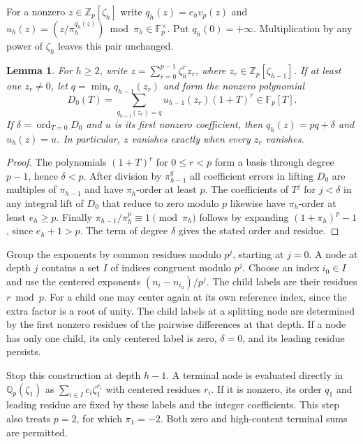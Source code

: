 \documentclass[11pt]{article}
\newtheorem{lemma}[theorem]{Lemma}
\newcommand{\Z}{\mathbb Z}
\newcommand{\Q}{\mathbb Q}
\newcommand{\F}{\mathbb F}
\newcommand{\ord}{\operatorname{ord}}
\begin{document}
For a nonzero $z\in\Z_p[\zeta_h]$ write $q_h(z)=e_hv_p(z)$ and $u_h(z)=(z/\pi_h^{q_h(z)})\bmod\pi_h\in\F_p^\times$. Put $q_h(0)=+\infty$. Multiplication by any power of $\zeta_h$ leaves this pair unchanged.

\begin{lemma}\label{rec}
For $h\ge2$, write $z=\sum_{r=0}^{p-1}\zeta_h^r z_r$, where $z_r\in\Z_p[\zeta_{h-1}]$. If at least one $z_r\ne0$, let $q=\min_r q_{h-1}(z_r)$ and form the nonzero polynomial
\[
D_0(T)=\sum_{q_{h-1}(z_r)=q}u_{h-1}(z_r)(1+T)^r \in\F_p[T].
\]
If $\delta=\ord_{T=0}D_0$ and $u$ is its first nonzero coefficient, then $q_h(z)=pq+\delta$ and $u_h(z)=u$. In particular, $z$ vanishes exactly when every $z_r$ vanishes.
\end{lemma}
\begin{proof}
The polynomials $(1+T)^r$ for $0\le r<p$ form a basis through degree $p-1$, hence $\delta<p$. After division by $\pi_{h-1}^{q}$ all coefficient errors in lifting $D_0$ are multiples of $\pi_{h-1}$ and have $\pi_h$-order at least $p$. The coefficients of $T^j$ for $j<\delta$ in any integral lift of $D_0$ that reduce to zero modulo $p$ likewise have $\pi_h$-order at least $e_h\ge p$. Finally $\pi_{h-1}/\pi_h^p\equiv1\pmod{\pi_h}$ follows by expanding $(1+\pi_h)^p-1$, since $e_h+1>p$. The term of degree $\delta$ gives the stated order and residue.
\end{proof}

Group the exponents by common residues modulo $p^j$, starting at $j=0$. A node at depth $j$ contains a set $I$ of indices congruent modulo $p^j$. Choose an index $i_0\in I$ and use the centered exponents $(n_i-n_{i_0})/p^j$. The child labels are their residues $r\bmod p$. For a child one may center again at its own reference index, since the extra factor is a root of unity. The child labels at a splitting node are determined by the first nonzero residues of the pairwise differences at that depth. If a node has only one child, its only centered label is zero, $\delta=0$, and its leading residue persists.

Stop this construction at depth $h-1$. A terminal node is evaluated directly in $\Q_p(\zeta_1)$ as $\sum_{i\in I} c_i\zeta_1^{r_i}$ with centered residues $r_i$. If it is nonzero, its order $q_1$ and leading residue are fixed by these labels and the integer coefficients. This step also treats $p=2$, for which $\pi_1=-2$. Both zero and high-content terminal sums are permitted.
\end{document}

